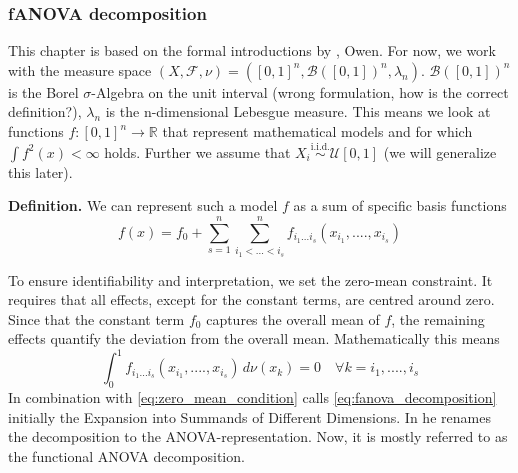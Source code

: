 \subsubsection*{fANOVA decomposition}
This chapter is based on the formal introductions by \cite{sobol1993sensitivity, sobol2001, hooker2004}, Owen.
For now, we work with the measure space $(X, \mathcal{F}, \nu) = ([0, 1]^n, \mathcal{B}([0, 1])^n, \lambda_{n})$. $\mathcal{B}([0, 1])^n$ is the Borel $\sigma$-Algebra on the unit interval (wrong formulation, how is the correct definition?), $\lambda_{n}$ is the n-dimensional Lebesgue measure. 
This means we look at functions $f: [0,1]^n \rightarrow \mathbb{R}$  that represent mathematical models and for which $\int f^2(x) < \infty$ holds.
Further we assume that $X_i \overset{\text{i.i.d.}}{\sim} \mathcal{U}[0, 1]$ (we will generalize this later).\par

\textbf{Definition.} We can represent such a model $f$ as a sum of specific basis functions
\begin{equation}
    f(x) = f_0 + \sum_{s=1}^{n} \sum_{i_1 <...<i_s}^{n} f_{i_{1}...i_{s}} (x_{i_{1}} , ....,x_{i_{s}})
    \label{eq:fanova_decomposition}
\end{equation}

To ensure identifiability and interpretation, we set the zero-mean constraint. It requires that all effects, except for the constant terms, are centred around zero. Since that the constant term $f_0$ captures the overall mean of $f$, the remaining effects quantify the deviation from the overall mean. Mathematically this means
\begin{equation}
    \int_{0}^{1} f_{i_{1}...i_{s}} (x_{i_{1}}, ...., x_{i_{s}}) \, d\nu (x_k) = 0 \quad \forall k = i_1, ...., i_s
    \label{eq:zero_mean_condition}
\end{equation}
In combination with \autoref{eq:zero_mean_condition}  \cite{sobol1993sensitivity} calls \autoref{eq:fanova_decomposition} initially the \ldq Expansion into Summands of Different Dimensions\rdq. In \cite{sobol2001} he renames the decomposition to the \ldq ANOVA-representation\rdq. Now, it is mostly referred to as the \ldq functional ANOVA decomposition\rdq \citep{hooker2004}.\par

